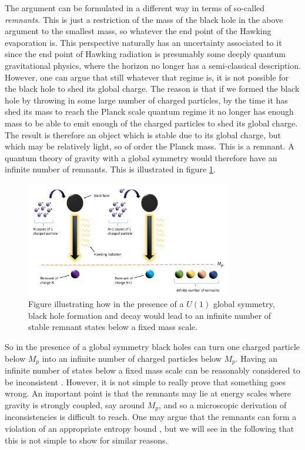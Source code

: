\documentclass[11pt,a4paper]{article}
\numberwithin{equation}{section}
\numberwithin{table}{section}\setlength{\multlinegap}{25pt}
\begin{document}
The argument can be formulated in a different way in terms of so-called {\it remnants}. This is just a restriction of the mass of the black hole in the above argument to the smallest mass, so whatever the end point of the Hawking evaporation is. This perspective naturally has an uncertainty associated to it since the end point of Hawking radiation is presumably some deeply quantum gravitational physics, where the horizon no longer has a semi-classical description. However, one can argue that still whatever that regime is, it is not possible for the black hole to shed its global charge. The reason is that if we formed the black hole by throwing in some large number of charged particles, by the time it has shed its mass to reach the Planck scale quantum regime it no longer has enough mass to be able to emit enough of the charged particles to shed its global charge. The result is therefore an object which is stable due to its global charge, but which may be relatively light, so of order the Planck mass. This is a remnant. A quantum theory of gravity with a global symmetry would therefore have an infinite number of remnants. This is illustrated in figure \ref{fig:bhgr}. 
\begin{figure}[t]
\centering
 \includegraphics[width=0.8\textwidth]{Figbhgr.pdf}
\caption{Figure illustrating how in the presence of a $U(1)$ global symmetry, black hole formation and decay would lead to an infinite number of stable remnant states below a fixed mass scale.}
\label{fig:bhgr}
\end{figure}

So in the presence of a global symmetry black holes can turn one charged particle below $M_p$ into an infinite number of charged particles below $M_p$. Having an infinite number of states below a fixed mass scale can be reasonably considered to be inconsistent \cite{Susskind:1995da}. However, it is not simple to really prove that something goes wrong. An important point is that the remnants may lie at energy scales where gravity is strongly coupled, say around $M_p$, and so a microscopic derivation of inconsistencies is difficult to reach. One may argue that the remnants can form a violation of an appropriate entropy bound \cite{Banks:2010zn}, but we will see in the following that this is not simple to show for similar reasons. 
\end{document}
